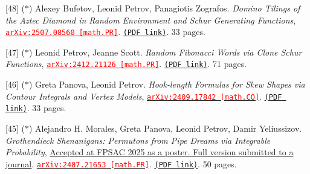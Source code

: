 \begin{etaremune}
\renewcommand{\labelenumi}{[\theenumi]}




\item[{[48]}] ($*$)
Alexey Bufetov, Leonid Petrov, Panagiotis Zografos.
\emph{Domino Tilings of the Aztec Diamond in Random Environment and Schur Generating Functions}, 
\href{https://arxiv.org/abs/2507.08560}{\texttt{{\textcolor{red}{arXiv:2507.08560 [math.PR]}}}}. \href{https://storage.lpetrov.cc/papers/48-domino-tilings-aztec.pdf}{\texttt{(PDF link)}}. 33 pages.















\item[{[47]}] ($*$)
Leonid Petrov, Jeanne Scott.
\emph{Random Fibonacci Words via Clone Schur Functions}, 
\href{https://arxiv.org/abs/2412.21126}{\texttt{{\textcolor{red}{arXiv:2412.21126 [math.PR]}}}}. \href{https://storage.lpetrov.cc/papers/47-random-fibonacci-words.pdf}{\texttt{(PDF link)}}. 71 pages.









\item[{[46]}] ($*$)
Greta Panova, Leonid Petrov.
\emph{Hook-length Formulas for Skew Shapes via Contour Integrals and Vertex Models}, 
\href{https://arxiv.org/abs/2409.17842}{\texttt{{\textcolor{red}{arXiv:2409.17842 [math.CO]}}}}. \href{https://storage.lpetrov.cc/papers/46-hook-length-formulas.pdf}{\texttt{(PDF link)}}. 33 pages.







\item[{[45]}] ($*$)
Alejandro H. Morales, Greta Panova, Leonid Petrov, Damir Yeliussizov.
\emph{Grothendieck Shenanigans: Permutons from Pipe Dreams via Integrable Probability}, \href{}{Accepted at FPSAC 2025 as a poster. Full version submitted to a journal}. 
\href{https://arxiv.org/abs/2407.21653}{\texttt{{\textcolor{red}{arXiv:2407.21653 [math.PR]}}}}. \href{https://storage.lpetrov.cc/papers/45-grothendieck-shenanigans-permutons.pdf}{\texttt{(PDF link)}}. 50 pages.












\end{etaremune}
